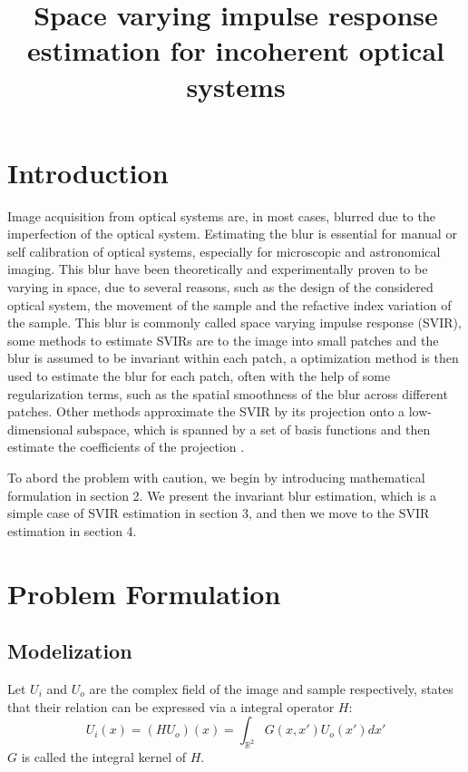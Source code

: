 \documentclass{article}
\begin{document}
\title{Space varying impulse response estimation for incoherent optical systems}
\maketitle
\tableofcontents

\section{Introduction}
Image acquisition from optical systems are, in most cases, blurred due to the imperfection of the optical system.
Estimating the blur is essential for manual or self calibration of optical systems, especially for microscopic and astronomical imaging.
This blur have been theoretically and experimentally proven to be varying in space, due to several reasons, such as the design of the considered optical system, the movement of the sample and the refactive index variation of the sample.
This blur is commonly called space varying impulse response (SVIR), some methods to estimate SVIRs are to the image into small patches and the blur is assumed to be invariant within each patch, a optimization method is then used to estimate the blur for each patch, often with the help of some regularization terms, such as the spatial smoothness of the blur across different patches. Other methods approximate the SVIR by its projection onto a low-dimensional subspace, which is spanned by a set of basis functions and then estimate the coefficients of the projection \cite{9311840}. 

To abord the problem with caution, we begin by introducing mathematical formulation in section 2. We present the invariant blur estimation, which is a simple case of SVIR estimation in section 3, and then we move to the SVIR estimation in section 4. 

\section{Problem Formulation}
\subsection{Modelization}

Let $U_i$ and $U_o$ are the complex field of the image and sample respectively, \cite{goodman1969introduction} states that their relation can be expressed via a integral operator $H$:
\begin{equation}
    U_i(x) = (HU_o)(x) = \int_{\mathbb{R}^2} G(x,x') U_o(x') dx'
\end{equation}
$G$ is called the integral kernel of $H$.
\end{document}
